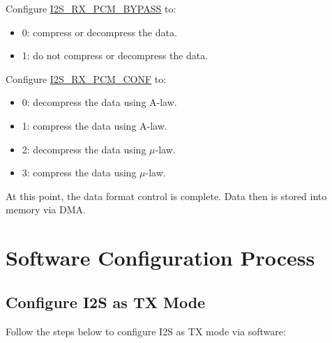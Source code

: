 \documentclass[main\_\_EN.tex]{subfiles}
\begin{document}
Configure \hyperref[fielddesc:I2SRXPCMBYPASS]{I2S\_RX\_PCM\_BYPASS} to:
\begin{itemize}
\item 0: compress or decompress the data.
\item 1: do not compress or decompress the data.
\end{itemize}
Configure \hyperref[fielddesc:I2SRXPCMCONF]{I2S\_RX\_PCM\_CONF} to:
\begin{itemize}
\item 0: decompress the data using A-law.
\item 1: compress the data using A-law.
\item 2: decompress the data using $\mu$-law.
\item 3: compress the data using $\mu$-law.
\end{itemize}
At this point, the data format control is complete. Data then is stored into memory via DMA.

\section{Software Configuration Process}
\subsection{Configure I2S as TX Mode}\label{sec:i2s-configure-i2s-tx-mode}
Follow the steps below to configure I2S as TX mode via software:
\end{document}
